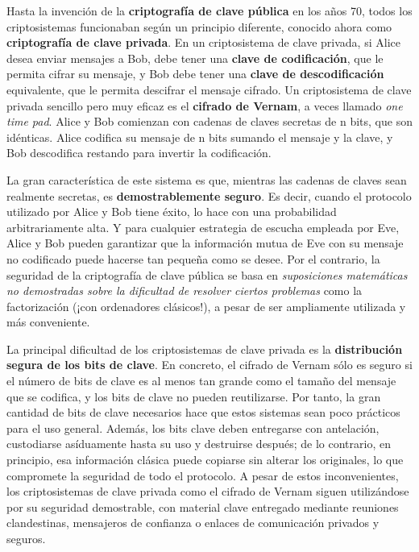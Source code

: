 \documentclass[a4paper,11pt]{book} %
\numberwithin{equation}{chapter}
\begin{document}
Hasta la invención de la \textbf{criptografía de clave pública} en los años 70, todos los criptosistemas funcionaban según un principio diferente, conocido ahora como \textbf{criptografía de clave privada}. En un criptosistema de clave privada, si Alice desea enviar mensajes a Bob, debe tener una \textbf{clave de codificación}, que le permita cifrar su mensaje, y Bob debe tener una \textbf{clave de descodificación} equivalente, que le permita descifrar el mensaje cifrado. Un criptosistema de clave privada sencillo pero muy eficaz es el \textbf{cifrado de Vernam}, a veces llamado \textit{one time pad}. Alice y Bob comienzan con cadenas de claves secretas de n bits, que son idénticas. Alice codifica su mensaje de n bits sumando el mensaje y la clave, y Bob descodifica restando para invertir la codificación.

La gran característica de este sistema es que, mientras las cadenas de claves sean realmente secretas, es \textbf{demostrablemente seguro}. Es decir, cuando el protocolo utilizado por Alice y Bob tiene éxito, lo hace con una probabilidad arbitrariamente alta.  Y para cualquier estrategia de escucha empleada por Eve, Alice y Bob pueden garantizar que la información mutua de Eve con su mensaje no codificado puede hacerse tan pequeña como se desee. Por el contrario, la seguridad de la criptografía de clave pública se basa en \textit{suposiciones matemáticas no demostradas sobre la dificultad de resolver ciertos problemas} como la factorización (¡con ordenadores clásicos!), a pesar de ser ampliamente utilizada y más conveniente.

La principal dificultad de los criptosistemas de clave privada es la \textbf{distribución segura de los bits de clave}. En concreto, el cifrado de Vernam sólo es seguro si el número de bits de clave es al menos tan grande como el tamaño del mensaje que se codifica, y los bits de clave no pueden reutilizarse. Por tanto, la gran cantidad de bits de clave necesarios hace que estos sistemas sean poco prácticos para el uso general. Además, los bits clave deben entregarse con antelación, custodiarse asíduamente hasta su uso y destruirse después; de lo contrario, en principio, esa información clásica puede copiarse sin alterar los originales, lo que compromete la seguridad de todo el protocolo. A pesar de estos inconvenientes, los criptosistemas de clave privada como el cifrado de Vernam siguen utilizándose por su seguridad demostrable, con material clave entregado mediante reuniones clandestinas, mensajeros de confianza o enlaces de comunicación privados y seguros.
\end{document}
